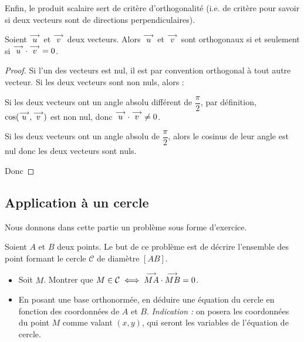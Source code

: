 Enfin, le produit scalaire sert de critère d'orthogonalité (i.e. de critère pour savoir si deux vecteurs sont de directions perpendiculaires).

\begin{prop}
    Soient $\overset{\longrightarrow}{u}$ et $\overset{\longrightarrow}{v}$ deux vecteurs. Alors $\overset{\longrightarrow}{u}$ et $\overset{\longrightarrow}{v}$ sont orthogonaux si et seulement si $\overset{\longrightarrow}{u}\cdot\overset{\longrightarrow}{v} = 0$.
\end{prop}
\begin{proof}
    Si l'un des vecteurs est nul, il est par convention orthogonal à tout autre vecteur. Si les deux vecteurs sont non nuls, alors :
    
    Si les deux vecteurs ont un angle absolu différent de $\dfrac{\pi}{2}$, par définition, $\cos(\overset{\longrightarrow}{u},\overset{\longrightarrow}{v})$ est non nul, donc $\overset{\longrightarrow}{u}\cdot \overset{\longrightarrow}{v} \neq 0$.
    
    Si les deux vecteurs ont un angle absolu de $\dfrac{\pi}{2}$, alors le cosinus de leur angle est nul donc les deux vecteurs sont nuls.
    
    Donc 
\end{proof}

\subsection{Application à un cercle}

Nous donnons dans cette partie un problème sous forme d'exercice.

\begin{exo}
    Soient $A$ et $B$ deux points. Le but de ce problème est de décrire l'ensemble des point formant le cercle $\mathcal C$ de diamètre $[AB]$.
    \begin{itemize}[label=$\bullet$]
        \item Soit $M$. Montrer que $M\in\mathcal C\iff \overset{\longrightarrow}{MA}\cdot \overset{\longrightarrow}{MB} = 0$.
        \item En posant une base orthonormée, en déduire une équation du cercle en fonction des coordonnées de $A$ et $B$. \textit{Indication :} on posera les coordonnées du point $M$ comme valant $(x,y)$, qui seront les variables de l'équation de cercle.
    \end{itemize}
\end{exo}

\newpage